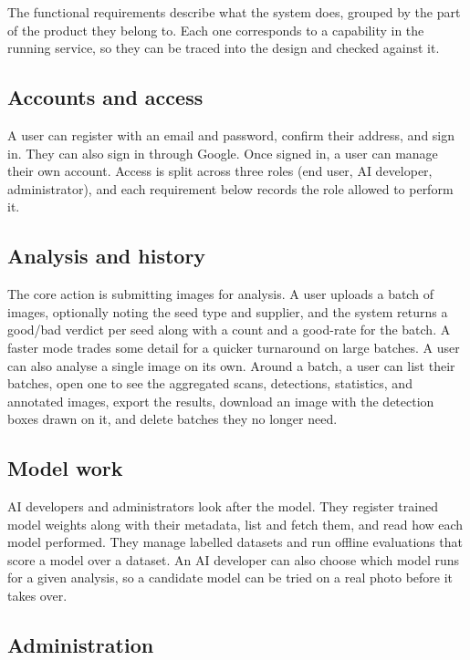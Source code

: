 The functional requirements describe what the system does, grouped by the part of
the product they belong to. Each one corresponds to a capability in the running
service, so they can be traced into the design and checked against it.

\subsection{Accounts and access}

A user can register with an email and password, confirm their address, and sign
in. They can also sign in through Google. Once signed in, a user can
manage their own account. Access is split across three roles (end user, AI developer,
administrator), and each requirement below records the role allowed to perform it.

\subsection{Analysis and history}

The core action is submitting images for analysis. A user uploads a batch of
images, optionally noting the seed type and supplier, and the system returns a
good/bad verdict per seed along with a count and a good-rate for the batch. A
faster mode trades some detail for a quicker turnaround on large batches. A user
can also analyse a single image on its own. Around a batch, a user can list their
batches, open one to see the aggregated scans, detections, statistics, and
annotated images, export the results, download an image with the detection boxes
drawn on it, and delete batches they no longer need.

\subsection{Model work}

AI developers and administrators look after the model. They register trained
model weights along with their metadata, list and fetch them, and read how each
model performed. They manage labelled datasets and run offline evaluations that
score a model over a dataset. An AI developer can also choose which model runs for
a given analysis, so a candidate model can be tried on a real photo before it
takes over.

\subsection{Administration}

